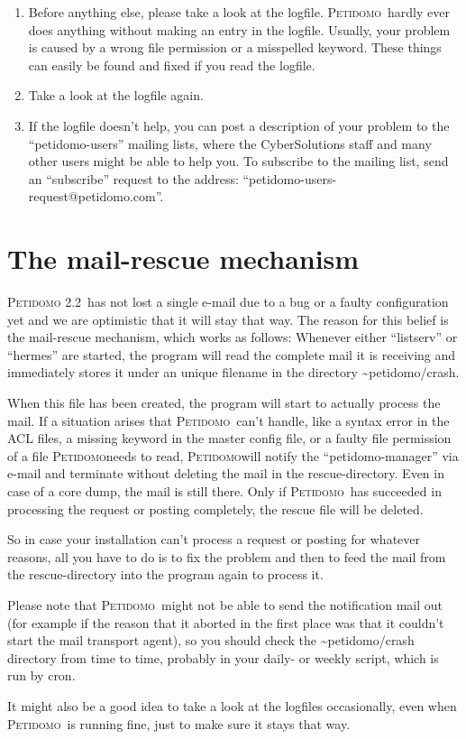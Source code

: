 \documentclass[a4paper,10pt]{scrreprt}
\newcommand{\Petidomo}{{\scshape Peti\-domo}}
\newcommand{\PetidomoTwo}{{\scshape Peti\-domo 2.2}}
\newcommand{\file}[1]{{\sf #1}}
\begin{document}
\begin{enumerate}

\item Before anything else, please take a look at the logfile.
\Petidomo\ hardly ever does anything without making an entry in the
logfile. Usually, your problem is caused by a wrong file permission or
a misspelled keyword. These things can easily be found and fixed if
you read the logfile.

\item Take a look at the logfile again.

\item If the logfile doesn't help, you can post a description of your
problem to the ``petidomo-users'' mailing lists, where the
CyberSolutions staff and many other users might be able to help you.
To subscribe to the mailing list, send an ``subscribe'' request to the
address: ``petidomo-users-request@petidomo.com''.

\end{enumerate}

\section{The mail-rescue mechanism}

\PetidomoTwo\ has not lost a single e-mail due to a bug or a faulty
configuration yet and we are optimistic that it will stay that way.
The reason for this belief is the mail-rescue mechanism, which works
as follows: Whenever either ``listserv'' or ``hermes'' are started,
the program will read the complete mail it is receiving and
immediately stores it under an unique filename in the directory
\file{\~{}petidomo/crash}.

When this file has been created, the program will start to actually
process the mail. If a situation arises that \Petidomo\ can't handle,
like a syntax error in the ACL files, a missing keyword in the master
config file, or a faulty file permission of a file \Petidomo needs to
read, \Petidomo will notify the ``petidomo-manager'' via e-mail and
terminate without deleting the mail in the rescue-directory. Even in
case of a core dump, the mail is still there. Only if \Petidomo\ has
succeeded in processing the request or posting completely, the rescue
file will be deleted.

So in case your installation can't process a request or posting for
whatever reasons, all you have to do is to fix the problem and then to
feed the mail from the rescue-directory into the program again to
process it.

Please note that \Petidomo\ might not be able to send the notification
mail out (for example if the reason that it aborted in the first place
was that it couldn't start the mail transport agent), so you should
check the \file{\~{}petidomo/crash} directory from time to time,
probably in your daily- or weekly script, which is run by cron.

It might also be a good idea to take a look at the logfiles
occasionally, even when \Petidomo\ is running fine, just to make sure
it stays that way.

%
%
\end{document}
